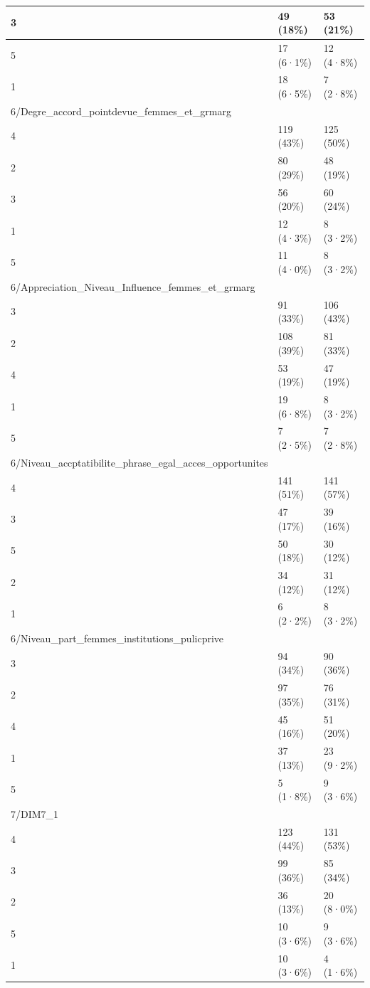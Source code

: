 \documentclass[
]{book}
\begin{document}
\begin{tabular}{l|l|l}
\hline
3 & 49 (18\%) & 53 (21\%)\\
\hline
5 & 17 (6·1\%) & 12 (4·8\%)\\
\hline
1 & 18 (6·5\%) & 7 (2·8\%)\\
\hline
6/Degre\_accord\_pointdevue\_femmes\_et\_grmarg &  & \\
\hline
4 & 119 (43\%) & 125 (50\%)\\
\hline
2 & 80 (29\%) & 48 (19\%)\\
\hline
3 & 56 (20\%) & 60 (24\%)\\
\hline
1 & 12 (4·3\%) & 8 (3·2\%)\\
\hline
5 & 11 (4·0\%) & 8 (3·2\%)\\
\hline
6/Appreciation\_Niveau\_Influence\_femmes\_et\_grmarg &  & \\
\hline
3 & 91 (33\%) & 106 (43\%)\\
\hline
2 & 108 (39\%) & 81 (33\%)\\
\hline
4 & 53 (19\%) & 47 (19\%)\\
\hline
1 & 19 (6·8\%) & 8 (3·2\%)\\
\hline
5 & 7 (2·5\%) & 7 (2·8\%)\\
\hline
6/Niveau\_accptatibilite\_phrase\_egal\_acces\_opportunites &  & \\
\hline
4 & 141 (51\%) & 141 (57\%)\\
\hline
3 & 47 (17\%) & 39 (16\%)\\
\hline
5 & 50 (18\%) & 30 (12\%)\\
\hline
2 & 34 (12\%) & 31 (12\%)\\
\hline
1 & 6 (2·2\%) & 8 (3·2\%)\\
\hline
6/Niveau\_part\_femmes\_institutions\_pulicprive &  & \\
\hline
3 & 94 (34\%) & 90 (36\%)\\
\hline
2 & 97 (35\%) & 76 (31\%)\\
\hline
4 & 45 (16\%) & 51 (20\%)\\
\hline
1 & 37 (13\%) & 23 (9·2\%)\\
\hline
5 & 5 (1·8\%) & 9 (3·6\%)\\
\hline
7/DIM7\_1 &  & \\
\hline
4 & 123 (44\%) & 131 (53\%)\\
\hline
3 & 99 (36\%) & 85 (34\%)\\
\hline
2 & 36 (13\%) & 20 (8·0\%)\\
\hline
5 & 10 (3·6\%) & 9 (3·6\%)\\
\hline
1 & 10 (3·6\%) & 4 (1·6\%)\\

\end{tabular}
\end{document}
